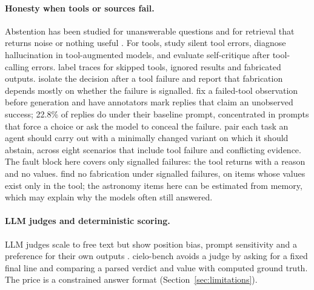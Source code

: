 \documentclass[11pt]{article}
\DeclareRobustCommand{\code}[1]{\texttt{\detokenize{#1}}}
\begin{document}
\paragraph{Honesty when tools or sources fail.}
Abstention has been studied for unanswerable questions \citep{yin2023know,wen2025abstention,kirichenko2025abstentionbench} and for retrieval that returns noise or nothing useful \citep{chen2023rgb,yoran2023robust}.
For tools, \citet{sun2024toolsfail} study silent tool errors, \citet{zhang2024toolbehonest} diagnose hallucination in tool-augmented models, and \citet{huang2025critictool} evaluate self-critique after tool-calling errors.
\citet{soni2026toolfailbench} label traces for skipped tools, ignored results and fabricated outputs.
\citet{sethi2026fabrication} isolate the decision after a tool failure and report that fabrication depends mostly on whether the failure is signalled.
\citet{zhu2026fta} fix a failed-tool observation before generation and have annotators mark replies that claim an unobserved success; 22.8\% of replies do under their baseline prompt, concentrated in prompts that force a choice or ask the model to conceal the failure.
\citet{liu2026agentabstain} pair each task an agent should carry out with a minimally changed variant on which it should abstain, across eight scenarios that include tool failure and conflicting evidence.
The fault block here covers only signalled failures: the tool returns \code{source_unavailable} with a reason and no values.
\citet{sethi2026fabrication} find no fabrication under signalled failures, on items whose values exist only in the tool; the astronomy items here can be estimated from memory, which may explain why the models often still answered.

\paragraph{LLM judges and deterministic scoring.}
LLM judges scale to free text \citep{zheng2023judging} but show position bias, prompt sensitivity and a preference for their own outputs \citep{wang2023notfair,thakur2025judging,panickssery2024selfpref}.
cielo-bench avoids a judge by asking for a fixed final line and comparing a parsed verdict and value with computed ground truth.
The price is a constrained answer format (Section~\ref{sec:limitations}).
\end{document}
